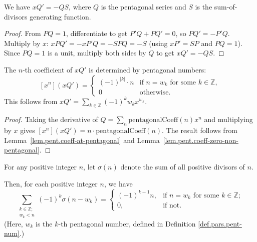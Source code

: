 \begin{lemma}
\label{lem.jtp.pentagonal-deriv-identity}
\leanhelper
\leanok
We have $xQ'=-QS$, where $Q$ is the pentagonal series and $S$ is the
sum-of-divisors generating function.
\end{lemma}

\begin{proof}
\leanok
From $PQ=1$, differentiate to get $P'Q+PQ'=0$, so $PQ'=-P'Q$.
Multiply by $x$: $xPQ'=-xP'Q=-SPQ=-S$ (using $xP'=SP$ and $PQ=1$).
Since $PQ=1$ is a unit, multiply both sides by $Q$ to get $xQ'=-QS$.
\end{proof}

\begin{lemma}
\label{lem.jtp.coeff-X-mul-deriv-pentagonal-match}
\leanhelper
\leanok
The $n$-th coefficient of $xQ'$ is determined by pentagonal numbers:
\[
[x^n](xQ') =
\begin{cases}
(-1)^{|k|}\cdot n & \text{if } n = w_k \text{ for some } k\in\mathbb{Z}, \\
0 & \text{otherwise}.
\end{cases}
\]
This follows from $xQ' = \sum_{k\in\mathbb{Z}} (-1)^k w_k x^{w_k}$.
\end{lemma}

\begin{proof}
\leanok
Taking the derivative of $Q = \sum_n \mathrm{pentagonalCoeff}(n) x^n$ and multiplying by $x$
gives $[x^n](xQ') = n\cdot\mathrm{pentagonalCoeff}(n)$. The result follows from
Lemma~\ref{lem.pent.coeff-at-pentagonal} and Lemma~\ref{lem.pent.coeff-zero-non-pentagonal}.
\end{proof}

\begin{theorem}
\label{thm.pars.euler-sum-div-rec}
\leantarget
\leanok
For any positive integer $n$, let
$\sigma(n)$ denote the sum of all positive divisors of $n$.

Then, for each positive integer $n$, we have
\[
\sum_{\substack{k\in\mathbb{Z};\\w_{k}<n}}\left(  -1\right)  ^{k}\sigma\left(
n-w_{k}\right)  =
\begin{cases}
\left(  -1\right)  ^{k-1}n, & \text{if }n=w_{k}\text{ for some }k\in
\mathbb{Z};\\
0, & \text{if not.}
\end{cases}
\]
(Here, $w_{k}$ is the $k$-th pentagonal number, defined in Definition
\ref{def.pars.pent-num}.)
\end{theorem}

